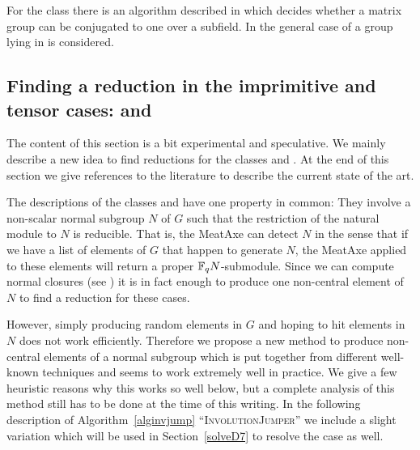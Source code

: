 For the class  there is an algorithm described in
\cite{GlasbyHowlett} which decides whether a matrix group can be
conjugated to one over a subfield. In \cite{GLGOB} the general case
of a group lying in  is considered.


\subsection{Finding a reduction in the imprimitive and tensor
cases:  and }
\label{solveD24}

The content of this section is a bit experimental and speculative. We
mainly describe a new idea to find reductions for the classes  and
. At the end of this section we give references to the literature
to describe the current state of the art.

The descriptions of the classes  and  have one property in
common: They involve a non-scalar normal subgroup $N$ of $G$ such
that the restriction of the natural module to $N$ is reducible. That
is, the MeatAxe can detect $N$ in the sense that if we have a list of
elements of $G$ that happen to generate $N$, the MeatAxe applied to
these elements will return a proper $\mathbb{F}_q N$-submodule. Since we can
compute normal closures (see \cite[Theorem~2.3.9]{Ser}) it is in fact
enough to produce one non-central element of $N$ to find a reduction for
these cases.

However, simply producing random elements in $G$ and hoping to hit elements
in $N$ does not work efficiently. Therefore we propose a new method to
produce non-central elements of a normal subgroup which is put together
from different well-known techniques and seems to work extremely well in
practice. We give a few heuristic reasons why this works so well below, but
a complete analysis of this method still has to be done at the time of 
this writing.
In the following description of Algorithm~\ref{alginvjump}
``\textsc{InvolutionJumper}'' we include a
slight variation which will be used in Section~\ref{solveD7} to resolve
the  case as well.

